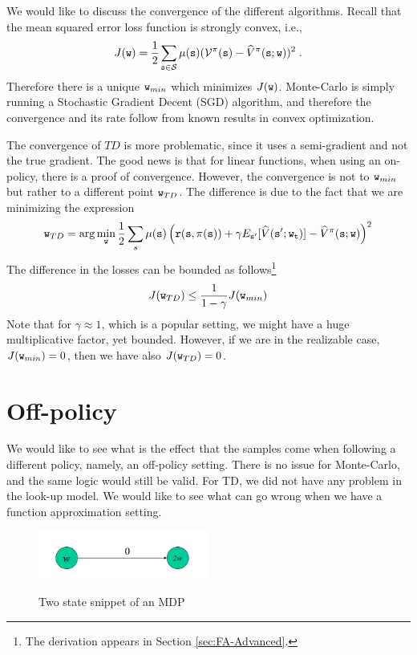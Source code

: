
We would like to discuss the convergence of the different
algorithms. Recall that the mean squared error loss function is
strongly convex, i.e.,
\[
J({\tt w})=\frac{1}{2}\sum_{{\tt s}\in\mathcal{S}}
\mu({\tt s})(\mathcal{V}^\pi({\tt s})-\widehat{V}^\pi({\tt s};{\tt w}))^2\;.
\]
Therefore there is a unique ${\tt w}_{min}$ which minimizes
$J({\tt w})$. Monte-Carlo is simply running a Stochastic Gradient
Decent (SGD) algorithm, and therefore the convergence and its rate
follow from known results in convex optimization.

The convergence of $TD$ is more problematic, since it uses a
semi-gradient and not the true gradient. The good news is that for
linear functions, when using an on-policy, there is a proof of
convergence. However, the convergence is not to ${\tt w}_{min}$ but
rather to a different point ${\tt w}_{TD}$. The difference is due to
the fact that we are minimizing the expression
\[
{\tt w}_{TD}=\arg\min_{\tt w}\frac{1}{2}\sum_s
\mu({\tt s})\left({\tt r}({\tt s},\pi({\tt s}))+\gamma
E_{{\tt s}'}[\widehat{V}({\tt s}';{\tt w}_{\tt t})]-\widehat{V}^\pi({\tt s};{\tt w})\right)^2
\]
The difference in the losses can be bounded as follows\footnote{ The
derivation appears in Section \ref{sec:FA-Advanced}.}
\[
J({\tt w}_{TD})\leq \frac{1}{1-\gamma}J({\tt w}_{min})
\]
Note that for $\gamma\approx 1$, which is a popular setting, we
might have a huge multiplicative factor, yet bounded. However, if we
are in the realizable case, $J({\tt w}_{min})=0$, then we have also
$J({\tt w}_{TD})=0$.




\section{Off-policy}
\label{sec:TD-FA}

We would like to see what is the effect that the samples come when
following a different policy, namely, an off-policy setting. There
is no issue for Monte-Carlo, and the same logic would still be
valid.  For TD, we did not have any problem in the look-up model. We
would like to see what can go wrong when we have a function
approximation setting.


\begin{figure}
  \begin{centering}
  \includegraphics[width=0.5\textwidth]{figures/L8-2states.png}\\
  \caption{Two state snippet of an MDP }\label{fig:L8-2state}
  \end{centering}
\end{figure}

